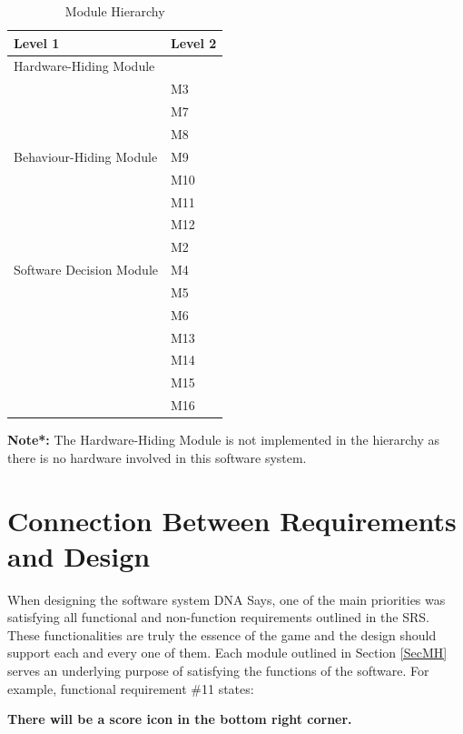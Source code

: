 \documentclass[12pt, titlepage]{article}
\begin{document}
\begin{table}[H]
\centering
\begin{tabular}{p{} p{}}
\toprule
\textbf{Level 1} & \textbf{Level 2}\\
\midrule

{Hardware-Hiding Module} & ~ \\
\midrule

\multirow{7}{0.3\textwidth}{Behaviour-Hiding Module} 
& M3\\
& M7\\
& M8\\
& M9\\
& M10\\
& M11\\ 
& M12\\
\midrule

\multirow{3}{0.3\textwidth}{Software Decision Module} 
& M2\\
& M4\\
& M5\\
& M6\\
& M13\\
& M14\\
& M15\\
& M16\\

\bottomrule

\end{tabular}
\caption{Module Hierarchy}
\label{TblMH}
\end{table}
\textbf{Note*:} The Hardware-Hiding Module is not implemented in the hierarchy as there is no hardware involved in this software system.

\section{Connection Between Requirements and Design} \label{SecConnection}

\par When designing the software system DNA Says, one of the main priorities was satisfying all functional and non-function requirements outlined in the SRS. These functionalities are truly the essence of the game and the design should support each and every one of them. Each module outlined in Section \ref{SecMH} serves an underlying purpose of satisfying the functions of the software. For example, functional requirement \#11 states: 

\begin{center} \textbf{There will be a score icon in the bottom right corner.} \end{center}
\end{document}
